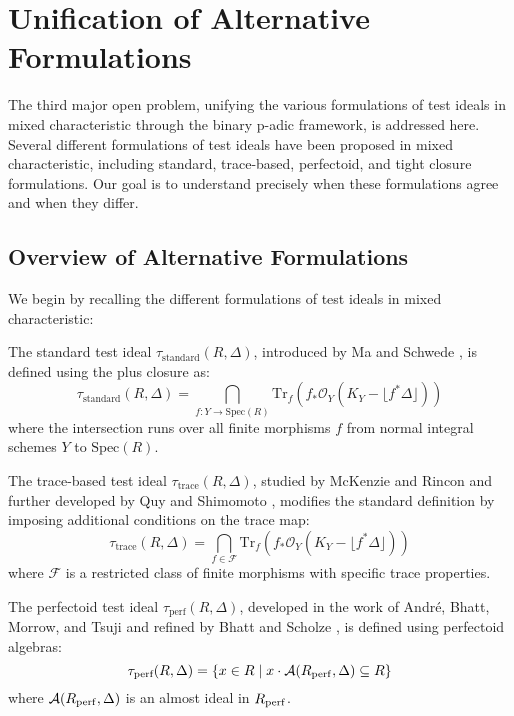 \section{Unification of Alternative Formulations}\label{sec:alternative_formulations}

The third major open problem, unifying the various formulations of test ideals in mixed characteristic through the binary p-adic framework, is addressed here. Several different formulations of test ideals have been proposed in mixed characteristic, including standard, trace-based, perfectoid, and tight closure formulations. Our goal is to understand precisely when these formulations agree and when they differ.

\subsection{Overview of Alternative Formulations}

We begin by recalling the different formulations of test ideals in mixed characteristic:

\begin{definition}\label{def:standard-test-ideal}
The standard test ideal $\tau_{\text{standard}}(R,\Delta)$, introduced by Ma and Schwede \cite{MS18}, is defined using the plus closure as:
$$\tau_{\text{standard}}(R,\Delta) = \bigcap_{f: Y \to \text{Spec}(R)} \text{Tr}_f(f_*\mathcal{O}_Y(K_Y - \lfloor f^*\Delta\rfloor))$$
where the intersection runs over all finite morphisms $f$ from normal integral schemes $Y$ to $\text{Spec}(R)$.
\end{definition}

\begin{definition}\label{def:trace-test-ideal}
The trace-based test ideal $\tau_{\text{trace}}(R,\Delta)$, studied by McKenzie and Rincon \cite{MR18} and further developed by Quy and Shimomoto \cite{QS17}, modifies the standard definition by imposing additional conditions on the trace map:
$$\tau_{\text{trace}}(R,\Delta) = \bigcap_{f \in \mathcal{F}} \text{Tr}_f(f_*\mathcal{O}_Y(K_Y - \lfloor f^*\Delta\rfloor))$$
where $\mathcal{F}$ is a restricted class of finite morphisms with specific trace properties.
\end{definition}

\begin{definition}\label{def:perfectoid-test-ideal-expanded}
The perfectoid test ideal $\tau_{\text{perf}}(R,\Delta)$, developed in the work of André, Bhatt, Morrow, and Tsuji \cite{AMBT19} and refined by Bhatt and Scholze \cite{BS22}, is defined using perfectoid algebras:
$$\tau_{\text{perf}}(R,\Delta) = \{x \in R \mid x \cdot \mathcal{A}(R_{\operatorname{perf}}, \Delta) \subseteq R\}$$
where $\mathcal{A}(R_{\operatorname{perf}}, \Delta)$ is an almost ideal in $R_{\operatorname{perf}}$.
\end{definition}

